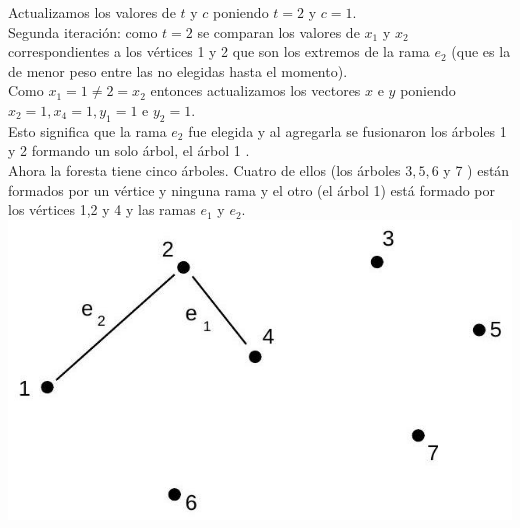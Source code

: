 \documentclass[10pt]{article}
\begin{document}
Actualizamos los valores de $t$ y $c$ poniendo $t=2$ y $c=1$.\\
Segunda iteración: como $t=2$ se comparan los valores de $x_{1}$ y $x_{2}$ correspondientes a los vértices 1 y 2 que son los extremos de la rama $e_{2}$ (que es la de menor peso entre las no elegidas hasta el momento).\\
Como $x_{1}=1 \neq 2=x_{2}$ entonces actualizamos los vectores $x$ e $y$ poniendo $x_{2}=1, x_{4}=1, y_{1}=1$ e $y_{2}=1$.\\
Esto significa que la rama $e_{2}$ fue elegida y al agregarla se fusionaron los árboles 1 y 2 formando un solo árbol, el árbol 1 .\\
Ahora la foresta tiene cinco árboles. Cuatro de ellos (los árboles $3,5,6$ y 7 ) están formados por un vértice y ninguna rama y el otro (el árbol 1) está formado por los vértices 1,2 y 4 y las ramas $e_{1}$ y $e_{2}$.\\
\includegraphics[max width=\textwidth, center]{2025_09_05_93c7c1835f249f70c0eeg-23(1)}
\end{document}

